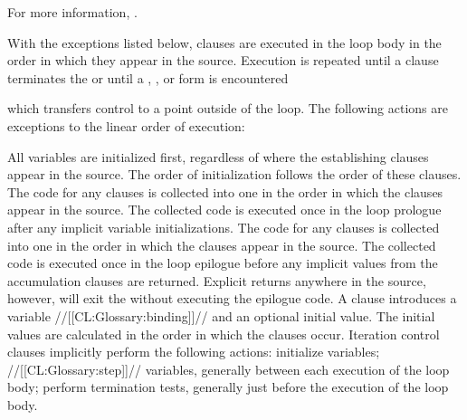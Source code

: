 For more information, \seesection\LOOPMisc.

\endsubsubsubsection%

\endsubsubsection%


 

  With the exceptions listed below, clauses are executed in the loop body
  in the order in which they appear in the source.  Execution is repeated 
  until a clause
  terminates the  or until a , ,
  or  form is encountered 

which transfers control to a point outside of the loop.
 The following actions are
  exceptions to the linear order of execution:
  \beginlist

\itemitem{\bull}  All variables are initialized first, 
  regardless of where the establishing clauses appear in the
  source.  The order of initialization follows the order of these clauses.
                                     \itemitem{\bull}  The code for any  clauses is collected
  into one  in the order in which the clauses appear in
  the source.  The collected code is executed once in the loop prologue
  after any implicit variable initializations.
  \itemitem{\bull}    The code for any  clauses is collected 
  into one  in the order in which the clauses appear in
  the source.  The collected code is executed once in the loop epilogue
  before any implicit values from the accumulation clauses are returned.
  Explicit returns anywhere in the source, however, will exit the 
   without executing the epilogue code.
                      \itemitem{\bull}  A  clause introduces a variable //[[CL:Glossary:binding]]//
  and an optional initial value.  The initial values are calculated 
  in the order in which the  clauses occur.
  \itemitem{\bull}  
  Iteration control clauses implicitly perform the following actions:
  \beginlist \itemitem{--}  initialize variables;
  \itemitem{--}  //[[CL:Glossary:step]]// variables, generally  between each execution of the loop body;
  \itemitem{--} perform termination tests,  generally just before the execution of the
  loop body.
 
  \endlist
  \endlist
  \endsubsubsection%

 

